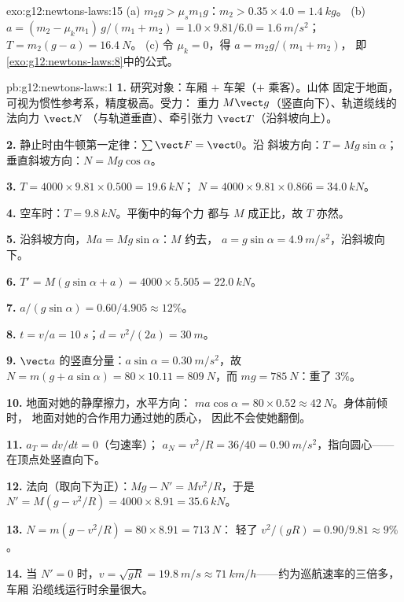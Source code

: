 \begin{solution}{exo:g12:newtons-laws:15}
(a) $m_2 g > \mu_s m_1 g$：$m_2 > 0.35 \times 4.0 = \qty{1.4}{kg}$。
(b) $a = (m_2 - \mu_k m_1)\,g/(m_1 + m_2) = 1.0 \times 9.81/6.0 =
\qty{1.6}{m/s^2}$；$T = m_2(g - a) = \qty{16.4}{N}$。
(c) 令 $\mu_k = 0$，得 $a = m_2 g/(m_1 + m_2)$，
即\cref{exo:g12:newtons-laws:8}中的公式。
\end{solution}

\begin{solution}{pb:g12:newtons-laws:1}
\textbf{1.} 研究对象：车厢 $+$ 车架（$+$ 乘客）。山体
固定于地面，可视为惯性参考系，精度极高。受力：
重力 $M\vect g$（竖直向下）、轨道缆线的法向力 $\vect N$
（与轨道垂直）、牵引张力 $\vect T$（沿斜坡向上）。

\textbf{2.} 静止时由牛顿第一定律：$\sum \vect F = \vect 0$。沿
斜坡方向：$T = Mg\sin\alpha$；垂直斜坡方向：$N = Mg\cos\alpha$。

\textbf{3.} $T = 4000 \times 9.81 \times 0.500 = \qty{19.6}{kN}$；
$N = 4000 \times 9.81 \times 0.866 = \qty{34.0}{kN}$。

\textbf{4.} 空车时：$T = \qty{9.8}{kN}$。平衡中的每个力
都与 $M$ 成正比，故 $T$ 亦然。

\textbf{5.} 沿斜坡方向，$Ma = Mg\sin\alpha$：$M$ 约去，
$a = g\sin\alpha = \qty{4.9}{m/s^2}$，沿斜坡向下。

\textbf{6.} $T' = M(g\sin\alpha + a) = 4000 \times 5.505 =
\qty{22.0}{kN}$。

\textbf{7.} $a/(g\sin\alpha) = 0.60/4.905 \approx 12\%$。

\textbf{8.} $t = v/a = \qty{10}{s}$；$d = v^2/(2a) = \qty{30}{m}$。

\textbf{9.} $\vect a$ 的竖直分量：$a\sin\alpha =
\qty{0.30}{m/s^2}$，故 $N = m(g + a\sin\alpha) = 80 \times 10.11 =
\qty{809}{N}$，而 $mg = \qty{785}{N}$：重了 $3\%$。

\textbf{10.} 地面对她的静摩擦力，水平方向：
$ma\cos\alpha = 80 \times 0.52 \approx \qty{42}{N}$。身体前倾时，
地面对她的合作用力通过她的质心，
因此不会使她翻倒。

\textbf{11.} $a_T = dv/dt = 0$（匀速率）；
$a_N = v^2/R = 36/40 = \qty{0.90}{m/s^2}$，指向圆心——
在顶点处竖直向下。

\textbf{12.} 法向（取向下为正）：$Mg - N' = Mv^2/R$，于是
$N' = M(g - v^2/R) = 4000 \times 8.91 = \qty{35.6}{kN}$。

\textbf{13.} $N = m(g - v^2/R) = 80 \times 8.91 = \qty{713}{N}$：
轻了 $v^2/(gR) = 0.90/9.81 \approx 9\%$。

\textbf{14.} 当 $N' = 0$ 时，$v = \sqrt{gR} = \qty{19.8}{m/s} \approx
\qty{71}{km/h}$——约为巡航速率的三倍多，车厢
沿缆线运行时余量很大。


\end{solution}
